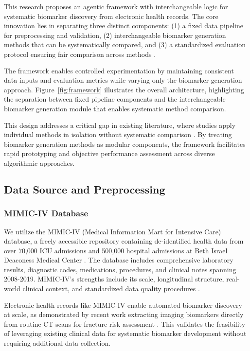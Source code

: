 \documentclass[12pt,a4paper]{article}
\begin{document}
This research proposes an agentic framework with interchangeable logic for systematic biomarker discovery from electronic health records. The core innovation lies in separating three distinct components: (1) a fixed data pipeline for preprocessing and validation, (2) interchangeable biomarker generation methods that can be systematically compared, and (3) a standardized evaluation protocol ensuring fair comparison across methods \cite{ref12,ref21}.

The framework enables controlled experimentation by maintaining consistent data inputs and evaluation metrics while varying only the biomarker generation approach. Figure~\ref{fig:framework} illustrates the overall architecture, highlighting the separation between fixed pipeline components and the interchangeable biomarker generation module that enables systematic method comparison.

This design addresses a critical gap in existing literature, where studies apply individual methods in isolation without systematic comparison \cite{ref12,ref14,ref16}. By treating biomarker generation methods as modular components, the framework facilitates rapid prototyping and objective performance assessment across diverse algorithmic approaches.

\subsection{Data Source and Preprocessing}

\subsubsection{MIMIC-IV Database}

We utilize the MIMIC-IV (Medical Information Mart for Intensive Care) database, a freely accessible repository containing de-identified health data from over 70,000 ICU admissions and 500,000 hospital admissions at Beth Israel Deaconess Medical Center \cite{ref11}. The database includes comprehensive laboratory results, diagnostic codes, medications, procedures, and clinical notes spanning 2008-2019. MIMIC-IV's strengths include its scale, longitudinal structure, real-world clinical context, and standardized data quality procedures \cite{ref11}. 

Electronic health records like MIMIC-IV enable automated biomarker discovery at scale, as demonstrated by recent work extracting imaging biomarkers directly from routine CT scans for fracture risk assessment \cite{ref29,ref30}. This validates the feasibility of leveraging existing clinical data for systematic biomarker development without requiring additional data collection.
\end{document}
